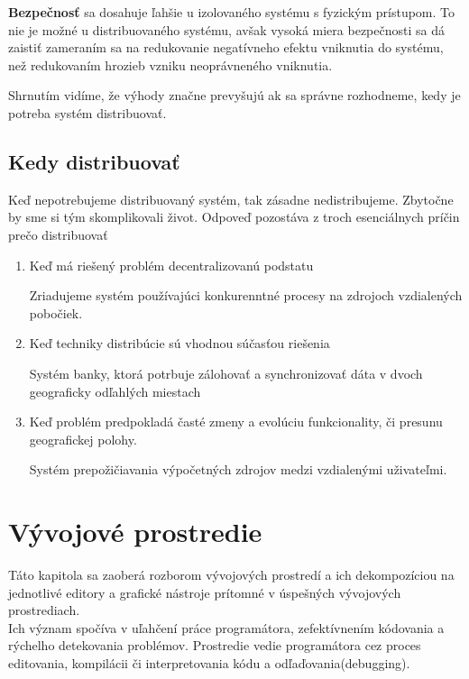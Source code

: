 \textbf{Bezpečnosť} sa dosahuje ľahšie u izolovaného systému s fyzickým prístupom. To nie je možné u distribuovaného systému, avšak vysoká miera bezpečnosti sa dá zaistiť zameraním sa na redukovanie negatívneho efektu vniknutia do systému, než redukovaním hrozieb vzniku neoprávneného vniknutia.

Shrnutím vidíme, že výhody značne prevyšujú ak sa správne rozhodneme, kedy je potreba systém distribuovať.

\subsection{Kedy distribuovať}


Keď nepotrebujeme distribuovaný systém, tak zásadne nedistribujeme. Zbytočne by sme si tým skomplikovali život. Odpoveď pozostáva z troch esenciálnych príčin prečo distribuovať

\begin{enumerate}
	\item Keď má riešený problém decentralizovanú podstatu \\
	\begin{exmpl}
		Zriadujeme systém používajúci konkurenntné procesy na zdrojoch vzdialených pobočiek.
	\end{exmpl}
	\item Keď techniky distribúcie sú vhodnou súčasťou riešenia \\
	\begin{exmpl}
		Systém banky, ktorá potrbuje zálohovať a synchronizovať dáta v dvoch geograficky odľahlých miestach
	\end{exmpl}
	\item Keď problém predpokladá časté zmeny a evolúciu funkcionality, či presunu geografickej polohy. \\
	\begin{exmpl}
		Systém prepožičiavania výpočetných zdrojov medzi vzdialenými uživateľmi.
	\end{exmpl}
\end{enumerate}

\section{Vývojové prostredie}
	Táto kapitola sa zaoberá rozborom vývojových prostredí a ich dekompozíciou na jednotlivé editory a grafické nástroje prítomné v úspešných vývojových prostrediach. \\
	
	Ich význam spočíva v uľahčení práce programátora, zefektívnením kódovania a rýchelho detekovania problémov. Prostredie vedie programátora cez proces editovania, kompilácii či interpretovania kódu a odľaďovania(debugging).
	
